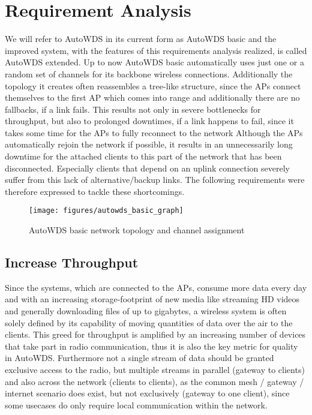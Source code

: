 \chapter{Requirement Analysis}
  \label{reqana}
  We will refer to AutoWDS in its current form as AutoWDS basic and the improved system, with the features of this requirements analysis realized, 
  is called AutoWDS extended.
  Up to now AutoWDS basic automatically uses just one or a random set of channels for its backbone wireless connections. 
  Additionally the topology it creates often reassembles a tree-like structure, since the APs connect themselves 
  to the first \ac{AP} which comes into range and additionally there are no fallbacks, if a link fails. 
  This results not only in severe bottlenecks for throughput, but also to prolonged downtimes, if a link happens to fail, since
  it takes some time for the APs to fully reconnect to the network Although the APs automatically rejoin the network if possible, 
  it results in an unnecessarily long downtime for the attached clients to this part of the network that has been disconnected. 
  Especially clients that depend on an uplink connection severely suffer from this lack of alternative/backup links. 
  The following requirements were therefore expressed to tackle these shortcomings.
  
  \begin{figure}[h!]
    \centering
    \texttt{[image: figures/autowds\_basic\_graph]}
    \caption{AutoWDS basic network topology and channel assignment}
    \label{fig:autowds_basic_graph}
  \end{figure}

  \section{Increase Throughput}
  \label{reqincreasethroughput}
  Since the systems, which are connected to the APs, consume more data every day and with an increasing storage-footprint of new media like streaming \ac{HD} videos
  and generally downloading files of up to gigabytes, a wireless system is often solely defined by its capability of moving quantities of data over the air to the clients.
  This greed for throughput is amplified by an increasing number of devices that take part in radio communication, 
  thus it is also the key metric for quality in AutoWDS. 
  Furthermore not a single stream of data should be granted exclusive access to the radio, but
  multiple streams in parallel (gateway to clients) and also across the network (clients to clients), 
  as the common mesh / gateway / internet scenario does exist, but not exclusively (gateway to one client),
  since some usecases do only require local communication within the network.
  
